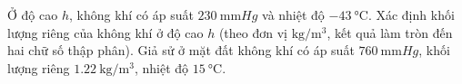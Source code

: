 \begin{ex}
	Ở độ cao $h$, không khí có áp suất $\SI{230}{\milli\meter Hg}$ và nhiệt độ $\SI{-43}{\celsius}$. Xác định khối lượng riêng của không khí ở độ cao $h$ (theo đơn vị $\si{\kilogram/\meter^3}$, kết quả làm tròn đến hai chữ số
	thập phân). Giả sử ở mặt đất không khí có áp suất $\SI{760}{\milli\meter Hg}$, khối lượng riêng $\SI{1.22}{\kilogram/\meter^3}$,
	nhiệt độ $\SI{15}{\celsius}$.
\end{ex}
